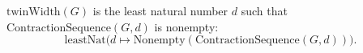 \(\mathrm{twinWidth}(G)\) is the least natural number \(d\) such that
\(\mathrm{ContractionSequence}(G,d)\) is nonempty:
\[
  \mathrm{leastNat}\bigl(d\mapsto
    \mathrm{Nonempty}(\mathrm{ContractionSequence}(G,d))\bigr).
\]
